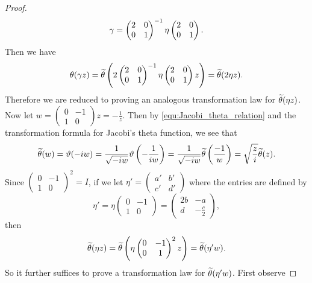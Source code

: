 \documentclass[12pt,oneside]{book}
\begin{document}
\begin{proof}
        \[
          \gamma = \begin{pmatrix} 2 & 0 \\ 0 & 1 \end{pmatrix}^{-1} \eta \begin{pmatrix} 2 & 0 \\ 0 & 1 \end{pmatrix}.
        \]
        Then we have
        \[
          \theta(\gamma z) = \widetilde{\theta}\left(2\begin{pmatrix} 2 & 0 \\ 0 & 1 \end{pmatrix}^{-1} \eta \begin{pmatrix} 2 & 0 \\ 0 & 1 \end{pmatrix}z\right) = \widetilde{\theta}(2\eta z).
        \]
        Therefore we are reduced to proving an analogous transformation law for $\widetilde{\theta}(\eta z)$. Now let $w = \begin{pmatrix} 0 & -1 \\ 1 & 0 \end{pmatrix}z = -\frac{1}{z}$. Then by \cref{equ:Jacobi_theta_relation} and the transformation formula for Jacobi's theta function, we see that
        \[
          \widetilde{\theta}(w) = \vartheta(-iw) = \frac{1}{\sqrt{-iw}}\vartheta\left(-\frac{1}{iw}\right) = \frac{1}{\sqrt{-iw}}\widetilde{\theta}\left(\frac{-1}{w}\right) = \sqrt{\frac{z}{i}}\widetilde{\theta}(z).
        \]
        Since $\begin{pmatrix} 0 & -1 \\ 1 & 0 \end{pmatrix}^{2} = I$, if we let $\eta' = \begin{pmatrix} a' & b' \\ c' & d' \end{pmatrix}$ where the entries are defined by
        \[
          \eta' = \eta\begin{pmatrix} 0 & -1 \\ 1 & 0 \end{pmatrix} = \begin{pmatrix} 2b & -a \\ d & -\frac{c}{2} \end{pmatrix},
        \]
        then
        \[
          \widetilde{\theta}(\eta z) = \widetilde{\theta}\left(\eta \begin{pmatrix} 0 & -1 \\ 0 & 1 \end{pmatrix}^{2} z\right) = \widetilde{\theta}(\eta'w).
        \]
        So it further suffices to prove a transformation law for $\widetilde{\theta}(\eta'w)$. First observe

\end{proof}
\end{document}
